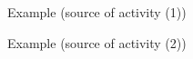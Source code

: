 

\begin{frame}{Example (source of activity (1))}
  \vspace{-0.3cm}
  \begin{center}
  \end{center}
\end{frame}

\begin{frame}{Example (source of activity (2))}
  \vspace{-0.3cm}  
  \begin{center}
  \end{center}
\end{frame}

